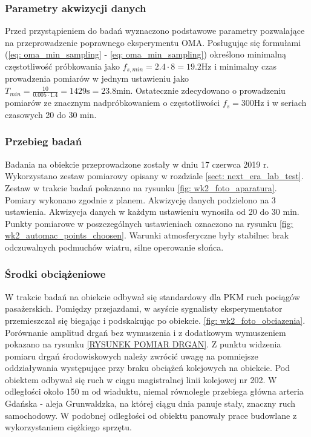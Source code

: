 \subsubsection{Parametry akwizycji danych}
Przed przystąpieniem do badań wyznaczono podstawowe parametry pozwalające na przeprowadzenie poprawnego eksperymentu OMA. Posługując się formułami (\ref{eq: oma_min_sampling} - \ref{eq: oma_min_sampling}) określono minimalną częstotliwość próbkowania jako $f_{s,min}=2.4\cdot8=19.2\text{Hz}$ i minimalny czas prowadzenia pomiarów w jednym ustawieniu jako $T_{min}=\frac{10}{0.005\cdot1.4}=1429\text{s}=23.8\text{min}$. Ostatecznie zdecydowano o prowadzeniu pomiarów ze znacznym nadpróbkowaniem o częstotliwości $f_s=300\text{Hz}$ i w seriach czasowych 20 do 30 min.


\subsubsection{Przebieg badań}
Badania na obiekcie przeprowadzone zostały w dniu 17 czerwca 2019 r. Wykorzystano zestaw pomiarowy opisany w rozdziale \ref{sect: next_era_lab_test}. Zestaw w trakcie badań pokazano na rysunku \ref{fig: wk2_foto_aparatura}. Pomiary wykonano zgodnie z planem. Akwizycję danych podzielono na 3 ustawienia. Akwizycja danych w każdym ustawieniu wynosiła od 20 do 30 min. Punkty pomiarowe w poszczególnych ustawieniach oznaczono na rysunku \ref{fig: wk2_automac_points_choosen}. Warunki atmosferyczne były stabilne: brak odczuwalnych podmuchów wiatru, silne operowanie słońca.

\subsubsection{Środki obciążeniowe}
W trakcie badań na obiekcie odbywał się standardowy dla PKM ruch pociągów pasażerskich. Pomiędzy przejazdami, w asyście sygnalisty eksperymentator przemieszczał się biegając i podskakując po obiekcie. \ref{fig: wk2_foto_obciazenia}. Porównanie amplitud drgań bez wymuszenia i z dodatkowym wymuszeniem pokazano na rysunku \ref{RYSUNEK POMIAR DRGAN}. Z punktu widzenia pomiaru drgań środowiskowych należy zwrócić uwagę na pomniejsze oddziaływania występujące przy braku obciążeń kolejowych na obiekcie. Pod obiektem odbywał się ruch w ciągu magistralnej linii kolejowej nr 202. W odległości około 150 m od wiaduktu, niemal równolegle przebiega główna arteria Gdańska - aleja Grunwaldzka, na której ciągu dnia panuje stały, znaczny ruch samochodowy. W podobnej odległości od obiektu panowały prace budowlane z wykorzystaniem ciężkiego sprzętu.


